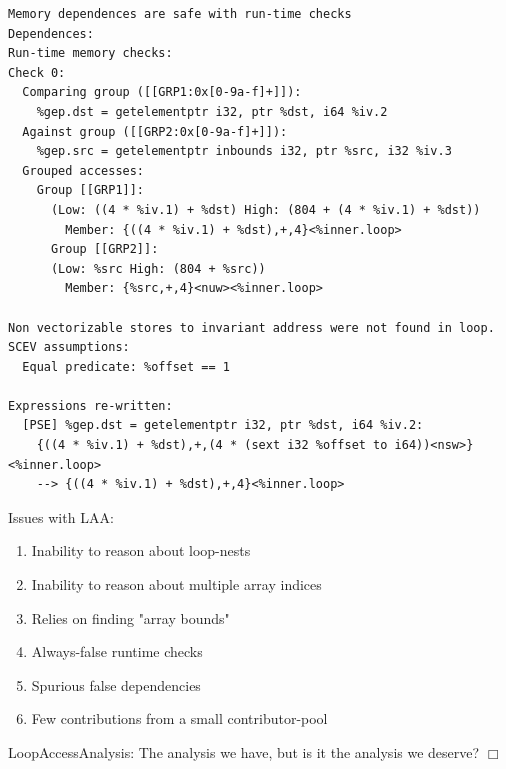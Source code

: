 \documentclass{beamer}
\begin{document}
\begin{frame}[containsverbatim]
  \begin{adjustwidth}{-1em}{-1em}
    \begin{verbatim}
Memory dependences are safe with run-time checks
Dependences:
Run-time memory checks:
Check 0:
  Comparing group ([[GRP1:0x[0-9a-f]+]]):
    %gep.dst = getelementptr i32, ptr %dst, i64 %iv.2
  Against group ([[GRP2:0x[0-9a-f]+]]):
    %gep.src = getelementptr inbounds i32, ptr %src, i32 %iv.3
  Grouped accesses:
    Group [[GRP1]]:
      (Low: ((4 * %iv.1) + %dst) High: (804 + (4 * %iv.1) + %dst))
        Member: {((4 * %iv.1) + %dst),+,4}<%inner.loop>
      Group [[GRP2]]:
      (Low: %src High: (804 + %src))
        Member: {%src,+,4}<nuw><%inner.loop>

Non vectorizable stores to invariant address were not found in loop.
SCEV assumptions:
  Equal predicate: %offset == 1

Expressions re-written:
  [PSE] %gep.dst = getelementptr i32, ptr %dst, i64 %iv.2:
    {((4 * %iv.1) + %dst),+,(4 * (sext i32 %offset to i64))<nsw>}<%inner.loop>
    --> {((4 * %iv.1) + %dst),+,4}<%inner.loop>
    \end{verbatim}
  \end{adjustwidth}
\end{frame}

\begin{frame}
  Issues with LAA:
  \begin{enumerate}
    \item Inability to reason about loop-nests
    \item Inability to reason about multiple array indices
    \item Relies on finding "array bounds"
    \item Always-false runtime checks
    \item Spurious false dependencies
    \item Few contributions from a small contributor-pool
  \end{enumerate}
\end{frame}

\begin{frame}
  LoopAccessAnalysis: The analysis we have, but is it the analysis we deserve? $\Box$
\end{frame}
\end{document}
